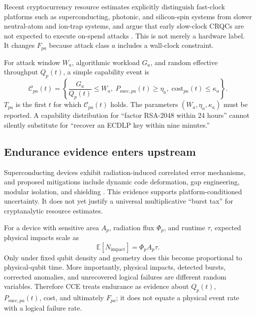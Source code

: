 \documentclass[10pt]{article}
\newcommand{\E}{\mathbb{E}}
\begin{document}
Recent cryptocurrency resource estimates explicitly distinguish fast-clock platforms such as superconducting, photonic, and silicon-spin systems from slower neutral-atom and ion-trap systems, and argue that early slow-clock CRQCs are not expected to execute on-spend attacks \cite{babbush2026}. This is not merely a hardware label. It changes $F_{pa}$ because attack class $a$ includes a wall-clock constraint.

For attack window $W_a$, algorithmic workload $G_a$, and random effective throughput $Q_p(t)$, a simple capability event is
\begin{equation}
\mathcal C_{pa}(t)=\left\{\frac{G_a}{Q_p(t)}\le W_a,\;
P_{\mathrm{succ},pa}(t)\ge\eta_a,\;
\mathrm{cost}_{pa}(t)\le\kappa_a\right\}.
\end{equation}
$T_{pa}$ is the first $t$ for which $\mathcal C_{pa}(t)$ holds. The parameters $(W_a,\eta_a,\kappa_a)$ must be reported. A capability distribution for ``factor RSA-2048 within 24 hours'' cannot silently substitute for ``recover an ECDLP key within nine minutes.''

\subsection{Endurance evidence enters upstream}

Superconducting devices exhibit radiation-induced correlated error mechanisms, and proposed mitigations include dynamic code deformation, gap engineering, modular isolation, and shielding \cite{mcewen2021,q3de2025,nho2026,pinckney2026}. This evidence supports platform-conditioned uncertainty. It does not yet justify a universal multiplicative ``burst tax'' for cryptanalytic resource estimates.

For a device with sensitive area $A_p$, radiation flux $\Phi_p$, and runtime $\tau$, expected physical impacts scale as
\begin{equation}
\E[N_{\mathrm{impact}}]=\Phi_p A_p\tau.
\label{eq:impacts}
\end{equation}
Only under fixed qubit density and geometry does this become proportional to physical-qubit time. More importantly, physical impacts, detected bursts, corrected anomalies, and unrecovered logical failures are different random variables. Therefore CCE treats endurance as evidence about $Q_p(t)$, $P_{\mathrm{succ},pa}(t)$, cost, and ultimately $F_{pa}$; it does not equate a physical event rate with a logical failure rate.
\end{document}
